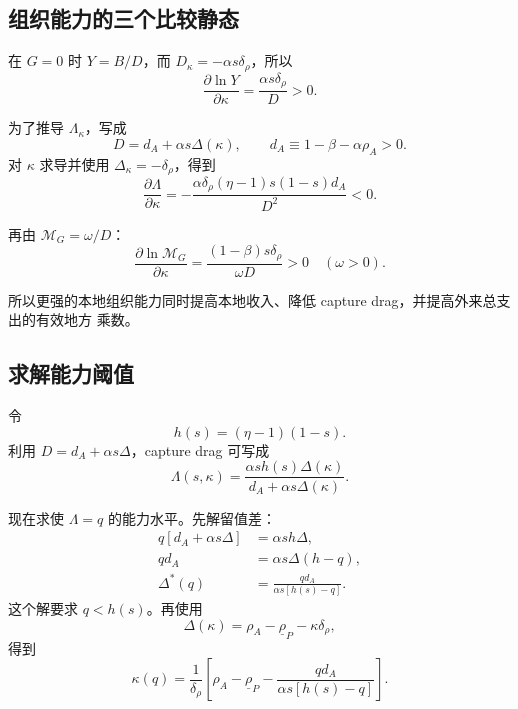 \documentclass[UTF8,11pt,scheme=chinese,fontset=fandol]{ctexart}
\newcommand{\MG}{\mathcal M_G}
\theoremstyle{definition}
\begin{document}
\subsection{组织能力的三个比较静态}

在 \(G=0\) 时 \(Y=B/D\)，而 \(D_\kappa=-\alpha s\delta_\rho\)，所以
\begin{equation}
\frac{\partial\ln Y}{\partial\kappa}
=\frac{\alpha s\delta_\rho}{D}>0.
\label{teach:eq:kappa-income}
\end{equation}

为了推导 \(\Lambda_\kappa\)，写成
\[
D=d_A+\alpha s\Delta(\kappa),
\qquad d_A\equiv1-\beta-\alpha\rho_A>0.
\]
对 \(\kappa\) 求导并使用 \(\Delta_\kappa=-\delta_\rho\)，得到
\begin{equation}
\frac{\partial\Lambda}{\partial\kappa}
=-\frac{\alpha\delta_\rho(\eta-1)s(1-s)d_A}{D^2}<0.
\label{teach:eq:kappa-drag}
\end{equation}

再由 \(\MG=\omega/D\)：
\begin{equation}
\frac{\partial\ln\MG}{\partial\kappa}
=\frac{(1-\beta)s\delta_\rho}{\omega D}>0
\quad(\omega>0).
\label{teach:eq:kappa-multiplier}
\end{equation}

所以更强的本地组织能力同时提高本地收入、降低 capture drag，并提高外来总支出的有效地方
乘数。

\subsection{求解能力阈值}

令
\[
h(s)=(\eta-1)(1-s).
\]
利用 \(D=d_A+\alpha s\Delta\)，capture drag 可写成
\begin{equation}
\Lambda(s,\kappa)
=\frac{\alpha s h(s)\Delta(\kappa)}
{d_A+\alpha s\Delta(\kappa)}.
\label{teach:eq:Lambda-threshold-form}
\end{equation}

现在求使 \(\Lambda=q\) 的能力水平。先解留值差：
\begin{align}
q[d_A+\alpha s\Delta]
&=\alpha s h\Delta,\\
qd_A&=\alpha s\Delta(h-q),\\
\Delta^*(q)
&=\frac{qd_A}{\alpha s[h(s)-q]}.
\end{align}
这个解要求 \(q<h(s)\)。再使用
\[
\Delta(\kappa)=\rho_A-\underline\rho_P-\kappa\delta_\rho,
\]
得到
\begin{equation}
\boxed{
\kappa(q)=\frac1{\delta_\rho}
\left[\rho_A-\underline\rho_P
-\frac{qd_A}{\alpha s[h(s)-q]}\right].}
\label{teach:eq:kappa-q}
\end{equation}
\end{document}
